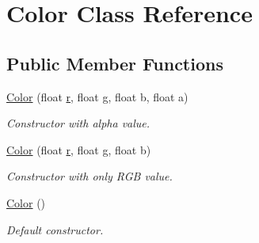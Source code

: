 \hypertarget{class_color}{}\section{Color Class Reference}
\label{class_color}
\subsection*{Public Member Functions}
\begin{DoxyCompactItemize}
\item 
\mbox{\label{class_color_a6e4627389673c8b5cce81bf3eec79938}} 
\mbox{\hyperlink{class_color_a6e4627389673c8b5cce81bf3eec79938}{Color}} (float \mbox{\hyperlink{class_color_a3958a556b47d2de3dd45c75aac833c20}{r}}, float g, float b, float a)
\begin{DoxyCompactList}\small\item\em Constructor with alpha value. \end{DoxyCompactList}\item 
\mbox{\label{class_color_a373c542c99fb83ce9c7c08aae76b2718}} 
\mbox{\hyperlink{class_color_a373c542c99fb83ce9c7c08aae76b2718}{Color}} (float \mbox{\hyperlink{class_color_a3958a556b47d2de3dd45c75aac833c20}{r}}, float g, float b)
\begin{DoxyCompactList}\small\item\em Constructor with only R\+GB value. \end{DoxyCompactList}\item 
\mbox{\label{class_color_a9a742cbe9f9f4037f5d9f4e81a9b2428}} 
\mbox{\hyperlink{class_color_a9a742cbe9f9f4037f5d9f4e81a9b2428}{Color}} ()
\begin{DoxyCompactList}\small\item\em Default constructor. \end{DoxyCompactList}\end{DoxyCompactItemize}
